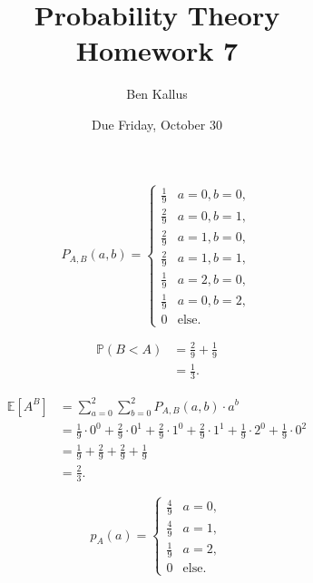 \documentclass[12pt]{article}
\title{Probability Theory \\ Homework 7}
\author{Ben Kallus}
\date{Due Friday, October 30}
\begin{document}
\pagecolor{black}
\color{white}
\maketitle

 $$P_{A,B}(a,b) =
\begin{cases}
    \frac19 & a = 0, b = 0, \\
    \frac29 & a = 0, b = 1, \\
    \frac29 & a = 1, b = 0, \\
    \frac29 & a = 1, b = 1, \\
    \frac19 & a = 2, b = 0, \\
    \frac19 & a = 0, b = 2, \\
    0 & \text{else.}
\end{cases}$$

\medskip
{}
\begin{align*}
    \mathbb P(B < A) &=\frac29 + \frac19 \\
                     &= \frac13.
\end{align*}

\medskip
{}
\begin{align*}
    \mathbb E[A^B] &= \sum_{a=0}^2 \sum_{b=0}^2 P_{A,B}(a,b) \cdot a^b \\
                   &= \frac19 \cdot 0^0 + \frac29 \cdot 0^1 + \frac29 \cdot 1^0 + \frac29 \cdot 1^1 + \frac19 \cdot 2^0 + \frac19 \cdot 0^2\\
                   &= \frac19 + \frac29 + \frac29 + \frac19 \\
                   &= \frac23.
\end{align*}

\medskip
{} \[p_A(a) = \begin{cases} \frac49 & a = 0, \\
                                           \frac49 & a = 1, \\
                                           \frac19 & a = 2, \\
                                           0 & \text{else.} \end{cases}\]
\begin{align*}
\end{align*}
\end{document}
